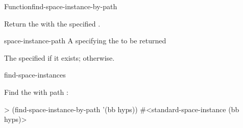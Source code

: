 \documentclass[10pt,twoside,english,pdftex]{article}
\begin{document}
\begin{functiondoc}{Function}{find-space-instance-by-path}%
  {
    \returns{} }

\fnsyntax

\fnpurpose Return the  with the specified
. 

\fnpackage {}

\fnmodule {}

\fnargs
\begin{args}{space-instance-path}
 A  specifying the
 to be returned 
\end{args}

\fnreturns The specified  if it exists; \nil{}
otherwise.

\begin{alsos}{find-space-instances}
\end{alsos}

\fnexample
Find the  with path :
%
\W\supp
\begin{example}
> (find-space-instance-by-path '(bb hyps))
#<standard-space-instance (bb hyps)>
\end{example}

\end{functiondoc}

\end{document}
